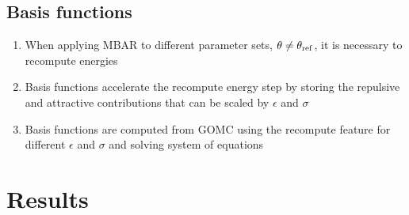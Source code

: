 \documentclass[11pt,a4paper]{article}
\begin{document}
\subsection{Basis functions}

\begin{enumerate}
	\item When applying MBAR to different parameter sets, $\theta \neq \theta_{\rm ref}$, it is necessary to recompute energies
	\item Basis functions accelerate the recompute energy step by storing the repulsive and attractive contributions that can be scaled by $\epsilon$ and $\sigma$
	\item Basis functions are computed from GOMC using the recompute feature for different $\epsilon$ and $\sigma$ and solving system of equations
\end{enumerate}

\section{Results}
\end{document}
